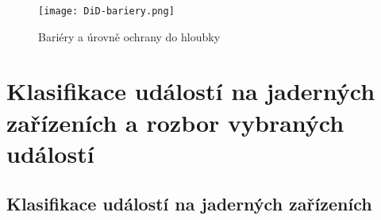 \begin{figure}[h!]
    \centering
    \texttt{[image: DiD-bariery.png]}
    \caption{Bariéry a úrovně ochrany do hloubky}
\end{figure}

\clearpage


\newpage

\section{Klasifikace událostí na jaderných zařízeních a rozbor vybraných událostí}

\subsection{Klasifikace událostí na jaderných zařízeních}

